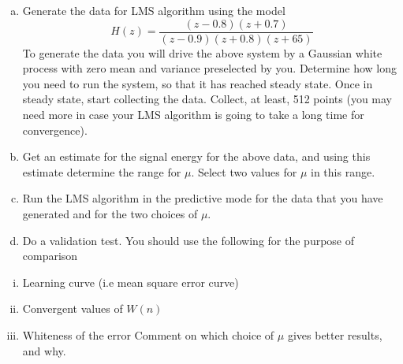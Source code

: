 \documentclass[journal,12pt,twocolumn]{IEEEtran}
\begin{document}
\begin{enumerate}
%
\begin{enumerate}[(a)]
\item Generate the data for LMS algorithm using the model
$$H(z)= \frac{(z-0.8)(z+0.7)}{(z-0.9)(z+0.8)(z+65)}$$
%
To generate the data you will drive the above system by a Gaussian white process with zero mean and variance preselected by you. Determine how long you need to run the system, so that it has reached steady state. Once in steady state, start collecting the data. Collect, at least, 512 points (you may need more in case your LMS algorithm is going to take a long time for convergence).
%
\item Get an estimate for the signal energy for the above data, and using this estimate determine the range for $\mu.$ 
Select two values for $\mu$ in this range.
\item Run the LMS algorithm in the predictive mode for the data that you have generated and for the two choices of $\mu.$
\item Do a validation test. You should use the following for the purpose of comparison
\end{enumerate}
\begin{enumerate}[i.]
\item Learning curve (i.e mean square error curve)
\item Convergent values of $W(n)$
\item Whiteness of the error
Comment on which choice of $\mu$ gives better results, and why.
\end{enumerate}
\end{enumerate}
\end{document}
